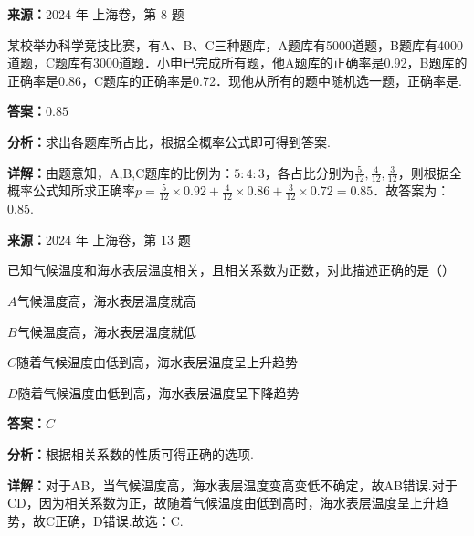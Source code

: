\begin{question}[points=5]
\textbf{来源：}2024 年 上海卷，第 8 题\par
某校举办科学竞技比赛，有A、B、C三种题库，A题库有5000道题，B题库有4000道题，C题库有3000道题．小申已完成所有题，他A题库的正确率是0.92，B题库的正确率是0.86，C题库的正确率是0.72．现他从所有的题中随机选一题，正确率是.
\fillin[{$0.85$}]
\begin{solution}
\textbf{答案：}$0.85$

\textbf{分析：}求出各题库所占比，根据全概率公式即可得到答案.

\textbf{详解：}由题意知，A,B,C题库的比例为：$5:4:3$，各占比分别为$\frac{5}{12},\frac{4}{12},\frac{3}{12}$，则根据全概率公式知所求正确率$p=\frac{5}{12}\times0.92+\frac{4}{12}\times0.86+\frac{3}{12}\times0.72=0.85$．故答案为：0.85.
\end{solution}
\end{question}

\begin{question}[points=4]
\textbf{来源：}2024 年 上海卷，第 13 题\par
已知气候温度和海水表层温度相关，且相关系数为正数，对此描述正确的是（\quad\quad）
\begin{choices}
  \item $A$气候温度高，海水表层温度就高
  \item $B$气候温度高，海水表层温度就低
  \item $C$随着气候温度由低到高，海水表层温度呈上升趋势
  \item $D$随着气候温度由低到高，海水表层温度呈下降趋势
\end{choices}
\begin{solution}
\textbf{答案：}$C$

\textbf{分析：}根据相关系数的性质可得正确的选项.

\textbf{详解：}对于AB，当气候温度高，海水表层温度变高变低不确定，故AB错误.对于CD，因为相关系数为正，故随着气候温度由低到高时，海水表层温度呈上升趋势，故C正确，D错误.故选：C.
\end{solution}
\end{question}


